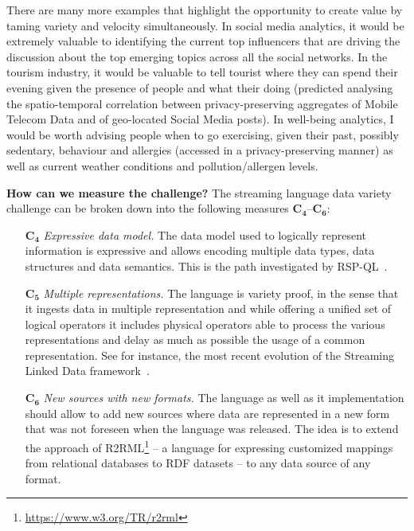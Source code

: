 There are many more examples that highlight the opportunity to create value by taming variety and velocity simultaneously. In social media analytics, it would be extremely valuable to identifying the current top influencers that are driving the discussion about the top emerging topics across all the social networks. In the tourism industry, it would be valuable to tell tourist where they can spend their evening given the presence of people and what their doing (predicted analysing the spatio-temporal correlation between privacy-preserving aggregates of Mobile Telecom Data and of geo-located Social Media posts). In well-being analytics, I would be worth advising people when to go exercising, given their past, possibly sedentary, behaviour and allergies (accessed in a privacy-preserving manner) as well as current weather conditions and pollution/allergen levels.

\textbf{How can we measure the challenge?}
The streaming language data variety challenge can be broken down
into the following measures $\mathbf{C_4}$--$\mathbf{C_6}$:

\begin{itemize}
  \item[$\mathbf{C_4}$] \emph{Expressive data model.}  The data model used to logically represent information is expressive and allows encoding multiple data types, data structures and data semantics.	This is the path investigated by RSP-QL~\cite{DellAglioDataScience2017,DBLP:conf/debs/ValleDM16}.
  \item[$\mathbf{C_5}$] \emph{Multiple representations.} The language is variety proof, in the sense that it ingests data in multiple representation and while offering a unified set of logical operators it includes physical operators able to process the various representations and delay as much as possible the usage of a common representation. See for instance, the most recent evolution of the Streaming Linked Data framework~\cite{DBLP:conf/esws/BalduiniV017a}. 
  \item[$\mathbf{C_6}$] \emph{New sources with new formats.} The language as well as it implementation should allow to add new sources where data are represented in a new form that was not foreseen when the language was released. The idea is to extend the approach of R2RML\footnote{\url{https://www.w3.org/TR/r2rml}} -- a language for expressing customized mappings from relational databases to RDF datasets -- to any data source of any format.
\end{itemize}

